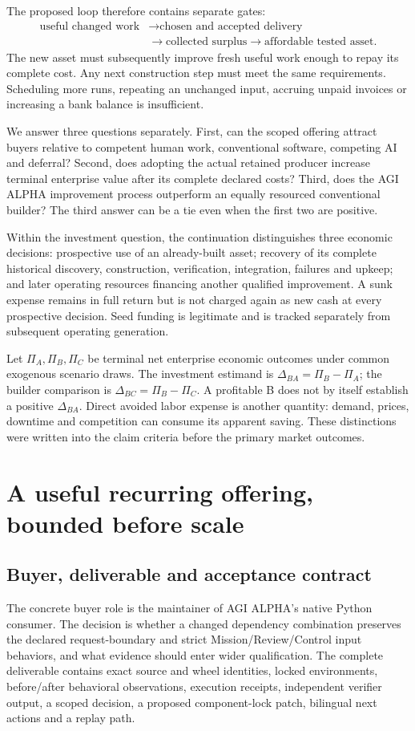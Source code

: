 \documentclass[11pt,a4paper]{article}
\begin{document}
The proposed loop therefore contains separate gates:
\[
\begin{aligned}
\text{useful changed work}&\longrightarrow\text{chosen and accepted delivery}\\
&\longrightarrow\text{collected surplus}\longrightarrow\text{affordable tested asset}.
\end{aligned}
\]
The new asset must subsequently improve fresh useful work enough to repay its complete cost.
Any next construction step must meet the same requirements. Scheduling more runs, repeating an
unchanged input, accruing unpaid invoices or increasing a bank balance is insufficient.

We answer three questions separately. First, can the scoped offering attract buyers relative to
competent human work, conventional software, competing AI and deferral? Second, does adopting the
actual retained producer increase terminal enterprise value after its complete declared costs?
Third, does the AGI ALPHA improvement process outperform an equally resourced conventional builder?
The third answer can be a tie even when the first two are positive.

Within the investment question, the continuation distinguishes three economic decisions:
prospective use of an already-built asset; recovery of its complete historical discovery,
construction, verification, integration, failures and upkeep; and later operating resources
financing another qualified improvement. A sunk expense remains in full return but is not
charged again as new cash at every prospective decision. Seed funding is legitimate and is
tracked separately from subsequent operating generation.


Let \(\Pi_A,\Pi_B,\Pi_C\) be terminal net enterprise economic outcomes under common exogenous
scenario draws. The investment estimand is \(\Delta_{BA}=\Pi_B-\Pi_A\); the builder comparison is
\(\Delta_{BC}=\Pi_B-\Pi_C\). A profitable B does not by itself establish a positive
\(\Delta_{BA}\). Direct avoided labor expense is another quantity: demand, prices, downtime and
competition can consume its apparent saving. These distinctions were written into the claim
criteria before the primary market outcomes.

\section{A useful recurring offering, bounded before scale}
\subsection{Buyer, deliverable and acceptance contract}
The concrete buyer role is the maintainer of AGI ALPHA's native Python consumer. The decision is
whether a changed dependency combination preserves the declared request-boundary and strict
Mission/Review/Control input behaviors, and what evidence should enter wider qualification.
The complete deliverable contains exact source and wheel identities, locked environments,
before/after behavioral observations, execution receipts, independent verifier output, a scoped
decision, a proposed component-lock patch, bilingual next actions and a replay path.
\end{document}
